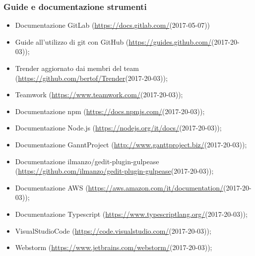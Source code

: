 \documentclass[../NormeDiProgetto_v4.0.0.tex]{subfiles}
\begin{document}
    \subsubsection{Guide e documentazione strumenti}
    \begin{itemize}
        \item Documentazione GitLab (\url{https://docs.gitlab.com/}(2017-05-07))
        \item Guide all'utilizzo di git con GitHub (\url{https://guides.github.com/}(2017-20-03));
        \item Trender aggiornato dai membri del team (\url{https://github.com/bertof/Trender}(2017-20-03));
        \item Teamwork (\url{https://www.teamwork.com/}(2017-20-03));
        \item Documentazione npm (\url{https://docs.npmjs.com/}(2017-20-03));
        \item Documentazione Node.js (\url{https://nodejs.org/it/docs/}(2017-20-03));
        \item Documentazione GanntProject (\url{http://www.ganttproject.biz/}(2017-20-03));
        \item Documentazione ilmanzo/gedit-plugin-gulpease \\(\url{https://github.com/ilmanzo/gedit-plugin-gulpease}(2017-20-03));
        \item Documentazione AWS (\url{https://aws.amazon.com/it/documentation/}(2017-20-03));
        \item Documentazione Typescript (\url{https://www.typescriptlang.org/}(2017-20-03));
        \item VisualStudioCode (\url{https://code.visualstudio.com/}(2017-20-03));
        \item Webstorm (\url{https://www.jetbrains.com/webstorm/}(2017-20-03));
    \end{itemize}
\end{document}
